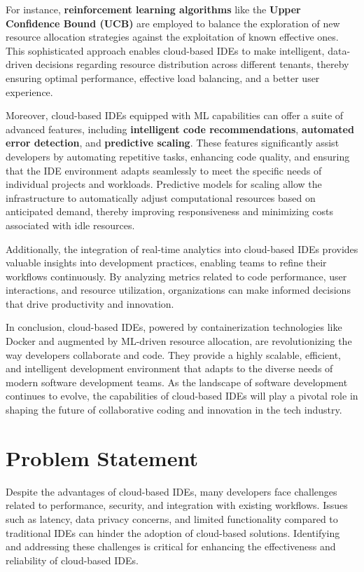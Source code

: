 \documentclass[12pt,a4paper,final]{report}
\begin{document}
For instance, \textbf{reinforcement learning algorithms} like the \textbf{Upper Confidence Bound (UCB)} are employed to balance the exploration of new resource allocation strategies against the exploitation of known effective ones. This sophisticated approach enables cloud-based IDEs to make intelligent, data-driven decisions regarding resource distribution across different tenants, thereby ensuring optimal performance, effective load balancing, and a better user experience.

Moreover, cloud-based IDEs equipped with ML capabilities can offer a suite of advanced features, including \textbf{intelligent code recommendations}, \textbf{automated error detection}, and \textbf{predictive scaling}. These features significantly assist developers by automating repetitive tasks, enhancing code quality, and ensuring that the IDE environment adapts seamlessly to meet the specific needs of individual projects and workloads. Predictive models for scaling allow the infrastructure to automatically adjust computational resources based on anticipated demand, thereby improving responsiveness and minimizing costs associated with idle resources.

Additionally, the integration of real-time analytics into cloud-based IDEs provides valuable insights into development practices, enabling teams to refine their workflows continuously. By analyzing metrics related to code performance, user interactions, and resource utilization, organizations can make informed decisions that drive productivity and innovation. 

In conclusion, cloud-based IDEs, powered by containerization technologies like Docker and augmented by ML-driven resource allocation, are revolutionizing the way developers collaborate and code. They provide a highly scalable, efficient, and intelligent development environment that adapts to the diverse needs of modern software development teams. As the landscape of software development continues to evolve, the capabilities of cloud-based IDEs will play a pivotal role in shaping the future of collaborative coding and innovation in the tech industry.



\section{Problem Statement}
Despite the advantages of cloud-based IDEs, many developers face challenges related to performance, security, and integration with existing workflows. Issues such as latency, data privacy concerns, and limited functionality compared to traditional IDEs can hinder the adoption of cloud-based solutions. Identifying and addressing these challenges is critical for enhancing the effectiveness and reliability of cloud-based IDEs.
\end{document}
